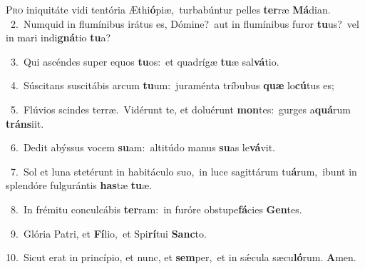 \lettrine{\initial\textcolor{\initialcolor}{P}}{ro} iniquitáte vidi tentória Æthi\-\textbf{ó}\-piæ,~\star turbabúntur pelles \textbf{ter}\-ræ \textbf{Má}\-dian.\\
{\numbfont\textcolor{\numbcolor}{~2.}}~Numquid in flumínibus irátus es, Dómine?~\dagger aut in flumínibus furor \textbf{tu}\-us?~\star vel in mari indi\-\textbf{gná}\-tio \textbf{tu}\-a?\par
{\numbfont\textcolor{\numbcolor}{~3.}}~Qui ascéndes super equos \textbf{tu}\-os:~\star et quadrígæ \textbf{tu}\-æ sal\-\textbf{vá}\-tio.\par
{\numbfont\textcolor{\numbcolor}{~4.}}~Súscitans suscitábis arcum \textbf{tu}\-um:~\star juraménta tríbubus \textbf{quæ} lo\-\textbf{cú}\-tus es;\par
{\numbfont\textcolor{\numbcolor}{~5.}}~Flúvios scindes terræ.~\dagger Vidérunt te, et doluérunt \textbf{mon}\-tes:~\star gurges a\-\textbf{quá}\-rum \textbf{tráns}\-iit.\par
{\numbfont\textcolor{\numbcolor}{~6.}}~Dedit abýssus vocem \textbf{su}\-am:~\star altitúdo manus \textbf{su}\-as le\-\textbf{vá}\-vit.\par
{\numbfont\textcolor{\numbcolor}{~7.}}~Sol et luna stetérunt in habitáculo suo,~\dagger in luce sagittárum tu\-\textbf{á}\-rum,~\star ibunt in splendóre fulgurántis \textbf{has}\-tæ \textbf{tu}\-æ.\par
{\numbfont\textcolor{\numbcolor}{~8.}}~In frémitu conculcábis \textbf{ter}\-ram:~\star in furóre obstupe\-\textbf{fá}\-cies \textbf{Gen}\-tes.\par
{\numbfont\textcolor{\numbcolor}{~9.}}~Glória Patri, et \textbf{Fí}\-lio,~\star et Spi\-\textbf{rí}\-tui \textbf{Sanc}\-to.\par
{\numbfont\textcolor{\numbcolor}{10.}}~Sicut erat in princípio, et nunc, et \textbf{sem}\-per,~\star et in sǽcula sæcu\-\textbf{ló}\-rum. \textbf{A}\-men.\par
